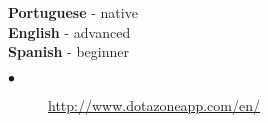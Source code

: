 \documentclass[9pt]{developercv} %
\begin{document}
\begin{minipage}[t]{0.3\textwidth}
	\vspace{-\baselineskip} %

	
	\textbf{Portuguese} - native\\
	\textbf{English} - advanced\\
	\textbf{Spanish} - beginner
\end{minipage}
\begin{minipage}[t]{.7\textwidth}
	\vspace{-\baselineskip} %

	
	\begin{description}
	\item[$\bullet$] \href{http://www.dotazoneapp.com/en/}{http://www.dotazoneapp.com/en/}
\end{description}

\end{minipage}
	
	
	
	

\end{document}
